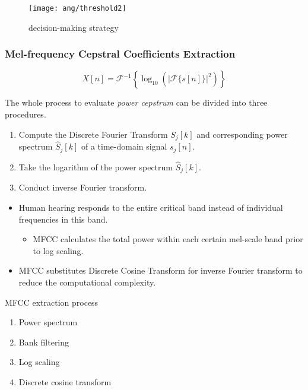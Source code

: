 \begin{frame}
\begin{figure}[H]
\centering
\texttt{[image: ang/threshold2]}
\caption{decision-making strategy}
\end{figure}
\end{frame}


\begin{frame}
\frametitle{Mel-frequency Cepstral Coefficients Extraction}
\begin{equation}
X[n] = \mathcal{F}^{-1} \left\{\log_{10} \left( |\mathcal{F}\{s[n]\}|^2 \right) \right\}
\end{equation}
\vspace{10pt}

The whole process to evaluate \textit{power cepstrum} can be divided into three procedures.
\begin{enumerate}
\item Compute the Discrete Fourier Transform $S_j[k]$ and corresponding power spectrum $\hat{S}_j[k]$ of a time-domain signal $s_j[n]$.
\item Take the logarithm of the power spectrum $\hat{S}_j[k]$.
\item Conduct inverse Fourier transform.
\end{enumerate}
\end{frame}


\begin{frame}
\begin{itemize}
	\item Human hearing responds to the entire critical band instead of individual frequencies in this band.
	\begin{itemize}
		\item MFCC calculates the total power within each certain mel-scale band prior to log scaling.
	\end{itemize}
	\item MFCC substitutes Discrete Cosine Transform for inverse Fourier transform to reduce the computational complexity.
\end{itemize}
\vspace{10pt}

MFCC extraction process
\begin{enumerate}
\item Power spectrum
\item Bank filtering
\item Log scaling
\item Discrete cosine transform
\end{enumerate}
\end{frame}

